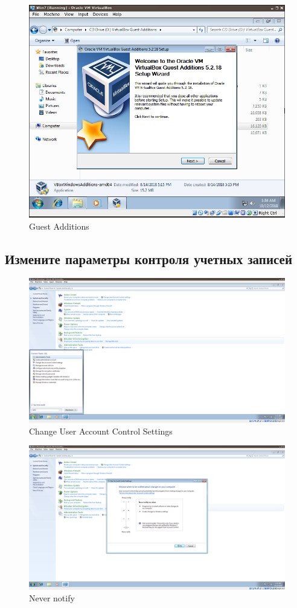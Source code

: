 \documentclass[a4paper]{article}
\begin{document}
\begin{figure}[H]
    \centering
    \includegraphics[width=\linewidth]{33.png}
    \caption{Guest Additions}
\end{figure}

\subsection{Измените параметры контроля учетных записей}
\begin{figure}[H]
    \centering
    \includegraphics[width=\linewidth]{40.png}
    \caption{Change User Account Control Settings}
\end{figure}
\begin{figure}[H]
    \centering
    \includegraphics[width=\linewidth]{41.png}
    \caption{Never notify}
\end{figure}
\end{document}
